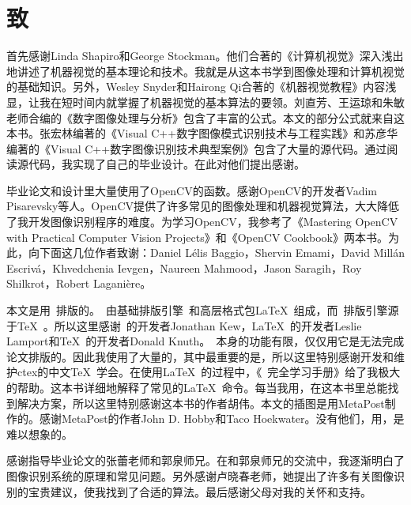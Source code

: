 
\chapter*{致}

首先感谢Linda Shapiro和George Stockman。他们合著的《计算机视觉》深入浅出地讲述了机器视觉的基本理论和技术。我就是从这本书学到图像处理和计算机视觉的基础知识。另外，Wesley Snyder和Hairong Qi合著的《机器视觉教程》内容浅显，让我在短时间内就掌握了机器视觉的基本算法的要领。刘直芳、王运琼和朱敏老师合编的《数字图像处理与分析》包含了丰富的公式。本文的部分公式就来自这本书。张宏林编著的《Visual C++数字图像模式识别技术与工程实践》和苏彦华编著的《Visual C++数字图像识别技术典型案例》包含了大量的源代码。通过阅读源代码，我实现了自己的毕业设计。在此对他们提出感谢。

毕业论文和设计里大量使用了OpenCV的函数。感谢OpenCV的开发者Vadim Pisarevsky等人。OpenCV提供了许多常见的图像处理和机器视觉算法，大大降低了我开发图像识别程序的难度。为学习OpenCV，我参考了《Mastering OpenCV with Practical Computer Vision Projects》和《OpenCV Cookbook》两本书。为此，向下面这几位作者致谢：Daniel Lélis Baggio，Shervin Emami，David Millán Escrivá，Khvedchenia Ievgen，Naureen Mahmood，Jason Saragih，Roy Shilkrot，Robert Laganière。

本文是用\XeLaTeX~排版的。\XeLaTeX~由基础排版引擎\XeTeX~和高层格式包\LaTeX~组成，而\XeTeX~排版引擎源于\TeX~。所以这里感谢\XeTeX~的开发者Jonathan Kew，\LaTeX~的开发者Leslie Lamport和\TeX~的开发者Donald Knuth。\XeLaTeX~本身的功能有限，仅仅用它是无法完成论文排版的。因此我使用了大量的，其中最重要的是，所以这里特别感谢开发和维护ctex的中文\TeX~学会。在使用\LaTeX~的过程中，《\LaTeXe~完全学习手册》给了我极大的帮助。这本书详细地解释了常见的\LaTeX~命令。每当我用，在这本书里总能找到解决方案，所以这里特别感谢这本书的作者胡伟。本文的插图是用MetaPost制作的。感谢MetaPost的作者John D. Hobby和Taco Hoekwater。没有他们，用，是难以想象的。

感谢指导毕业论文的张蕾老师和郭泉师兄。在和郭泉师兄的交流中，我逐渐明白了图像识别系统的原理和常见问题。另外感谢卢晓春老师，她提出了许多有关图像识别的宝贵建议，使我找到了合适的算法。最后感谢父母对我的关怀和支持。

